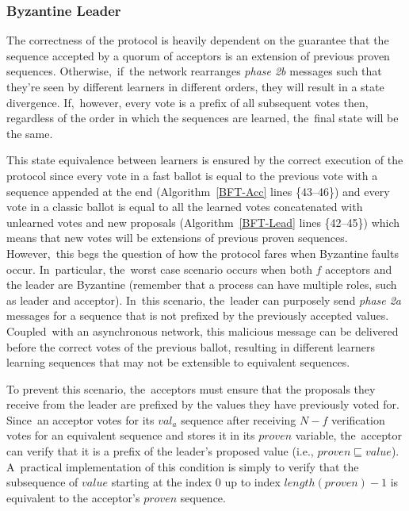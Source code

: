 \documentclass[algorithms,article,accept,moreauthors,pdftex,10pt,a4paper]{Definitions/mdpi}
\begin{document}
\subsubsection{Byzantine Leader}
The correctness of the protocol is heavily dependent on the guarantee that the sequence accepted by a quorum of acceptors is an extension of previous 
proven sequences. Otherwise,~if~the network rearranges \textit{phase 2b} messages such that they're seen by different learners in different orders, they will result in a state divergence. If,~however, every vote is a prefix of all subsequent votes then, regardless of the order in which the sequences are learned, the~final state will be the same. \par 
This state equivalence between learners is ensured by the correct execution of the protocol since every vote in a fast ballot is equal to the previous vote with a sequence appended at the end (Algorithm~\ref{BFT-Acc} lines \{43--46\}) and every vote in a classic ballot is equal to all the learned votes concatenated with unlearned votes and new proposals (Algorithm~\ref{BFT-Lead} lines \{42--45\}) which means that new votes will be extensions of previous proven sequences. However,~this begs the question of how the protocol fares when Byzantine faults occur. In~particular, the~worst case scenario occurs when both $f$ acceptors and the leader are Byzantine (remember that a process can have multiple roles, such as leader and acceptor). In~this scenario, the~leader can purposely send \textit{phase 2a} messages for a sequence that is not prefixed by the previously accepted values. Coupled~with an asynchronous network, this malicious message can be delivered before the correct votes of the previous ballot, resulting in different learners learning sequences that may not be extensible to equivalent sequences. \par
To prevent this scenario, the~acceptors must ensure that the proposals they receive from the leader are prefixed by the values they have previously voted for. Since~an acceptor votes for its $val_a$ sequence after receiving $N-f$ verification votes for an equivalent sequence and stores it in its $proven$ variable, the~acceptor can verify that it is a prefix of the leader's proposed value (i.e., $proven \sqsubseteq value$). A~practical implementation of this condition is simply to verify that the subsequence of $value$ starting at the index $0$ up to index $length(proven)-1$ is equivalent to the acceptor's $proven$ sequence. 
\end{document}
